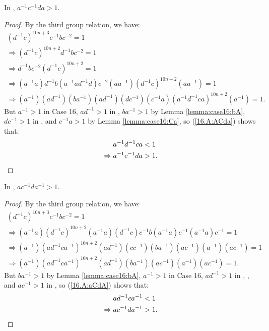\begin{lemma} In , $a^{-1}c^{-1}da > 1$.
\label{lemma:case16:A:ACda}
\end{lemma}
\begin{proof} By the third group relation, we have:
\begin{align}
(d^{-1}c)^{10n+3}c^{-1}bc^{-2} =1\nonumber{}\\
\Rightarrow{}(d^{-1}c)^{10n+2}d^{-1}bc^{-2} =1\nonumber{}\\
\Rightarrow{}d^{-1}bc^{-2}(d^{-1}c)^{10n+2}=1\nonumber{}\\
\Rightarrow{}(a^{-1}a)d^{-1}b(a^{-1}ad^{-1}d)c^{-2}(aa^{-1})(d^{-1}c)^{10n+2}(aa^{-1})=1\nonumber{}\\
\Rightarrow{}(a^{-1})(ad^{-1})(ba^{-1})(ad^{-1})(dc^{-1})(c^{-1}a)(a^{-1}d^{-1}ca)^{10n+2}(a^{-1})=1.
\label{16.A:ACda}
\end{align} 
But $a^{-1}>1$ in Case 16, $ad^{-1}>1$ in , $ba^{-1}>1$ by Lemma \ref{lemma:case16:bA}, $dc^{-1}>1$ in , and $c^{-1}a>1$ by Lemma \ref{lemma:case16:Ca}, so (\ref{16.A:ACda}) shows that:
\begin{align*}
a^{-1}d^{-1}ca&<1\\
\Rightarrow{}a^{-1}c^{-1}da&>1.\qedhere
\end{align*}
\end{proof}

\begin{lemma} In , $ac^{-1}da^{-1}>1$.
\label{lemma:case16.A:aCdA}
\end{lemma}
\begin{proof} By the third group relation, we have:
\begin{align}
(d^{-1}c)^{10n+3}c^{-1}bc^{-2}=1\nonumber{}\\
\Rightarrow{}(a^{-1}a)(d^{-1}c)^{10n+2}(a^{-1}a)(d^{-1}c)c^{-1}b(a^{-1}a)c^{-1}(a^{-1}a)c^{-1}=1\nonumber{}\\
\Rightarrow{}(a^{-1})(ad^{-1}ca^{-1})^{10n+2}(ad^{-1})(cc^{-1})(ba^{-1})(ac^{-1})(a^{-1})(ac^{-1})=1\nonumber{}\\
\Rightarrow{}(a^{-1})(ad^{-1}ca^{-1})^{10n+2}(ad^{-1})(ba^{-1})(ac^{-1})(a^{-1})(ac^{-1})=1.
\label{16.A:aCdA}
\end{align}
But $ba^{-1}>1$ by Lemma \ref{lemma:case16:bA}, $a^{-1}>1$ in Case 16, $ad^{-1}>1$ in , , and $ac^{-1}>1$ in , so (\ref{16.A:aCdA}) shows that:
\begin{align*}
ad^{-1}ca^{-1}&<1\\
\Rightarrow{}ac^{-1}da^{-1}&>1.\qedhere
\end{align*}
\end{proof}

